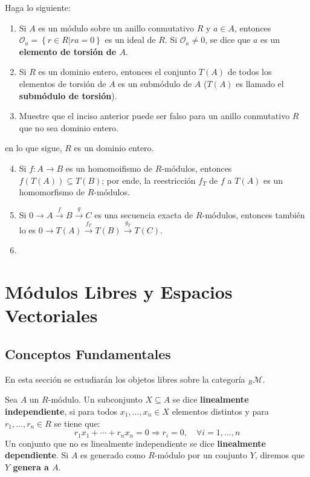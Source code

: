 \documentclass[12pt]{report}
\newcounter{it}
\theoremstyle{largebreak}
\newcommand\cf[3]{\ensuremath{#1:#2\rightarrow#3}}
\begin{document}
    \begin{excer}
        Haga lo siguiente:
        \begin{enumerate}[label = \textit{(\alph*)}]
            \item Si $A$ es un módulo sobre un anillo conmutativo $R$ y $a\in A$, entonces $\mathcal{O}_a=\left\{r\in R\Big|ra=0 \right\}$ es un ideal de $R$. Si $\mathcal{O}_a\neq0$, se dice que $a$ es un \textbf{elemento de torsión de $A$}.
            \item Si $R$ es un dominio entero, entonces el conjunto $T(A)$ de todos los elementos de torsión de $A$ es un submódulo de $A$ ($T(A)$ es llamado el \textbf{submódulo de torsión}).
            \item Muestre que el inciso anterior puede ser falso para un anillo conmutativo $R$ que no sea dominio entero.
        \end{enumerate}
        en lo que sigue, $R$ es un dominio entero.
        \begin{enumerate}[label = \textit{(\alph*)}]
            \setcounter{enumi}{3}
            \item Si $\cf{f}{A}{B}$ es un homomoifismo de $R$-módulos, entonces $f(T(A))\subseteq T(B)$; por ende, la reestricción $f_T$ de $f$ a $T(A)$ es un homomorfismo de $R$-módulos.
            \item Si $0\rightarrow A\overset{f}{\rightarrow}B\overset{g}{\rightarrow}C$ es una secuencia exacta de $R$-módulos, entonces también lo es $0\rightarrow T(A)\overset{f_T}{\rightarrow}T(B)\overset{g_T}{\rightarrow}T(C)$.
            \item 
        \end{enumerate}
    \end{excer}

    \newpage

    \chapter{Módulos Libres y Espacios Vectoriales}

    \section{Conceptos Fundamentales}

    En esta sección se estudiarán los objetos libres sobre la categoría ${}_R\mathcal{M}$.

    \begin{mydef}
        Sea $A$ un $R$-módulo. Un subconjunto $X\subseteq A$ se dice \textbf{linealmente independiente}, si para todos $x_1,...,x_n\in X$ elementos distintos y para $r_1,...,r_n\in R$ se tiene que:
        \begin{equation*}
            r_1x_1+\cdots+r_nx_n=0\Rightarrow r_i=0,\quad\forall i=1,...,n
        \end{equation*}
        Un conjunto que no es linealmente independiente se dice \textbf{linealmente dependiente}. Si $A$ es generado como $R$-módulo por un conjunto $Y$, diremos que \textbf{$Y$ genera a $A$}.

        
    \end{mydef}
    
\end{document}
